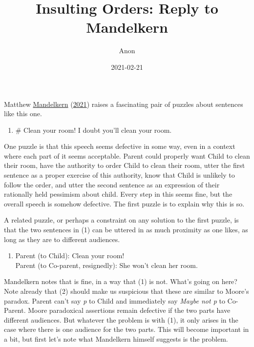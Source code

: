 \documentclass[
  12pt,
]{article}
\title{Insulting Orders: Reply to Mandelkern}
\author{Anon}
\date{2021-02-21}
\providecommand{\tightlist}{%
  \setlength{\itemsep}{0pt}\setlength{\parskip}{0pt}}
\begin{document}
\maketitle

Matthew \protect\hyperlink{ref-Mandelkern2021}{Mandelkern}
(\protect\hyperlink{ref-Mandelkern2021}{2021}) raises a fascinating pair
of puzzles about sentences like this one.

\begin{enumerate}
\def\labelenumi{(\arabic{enumi})}
\tightlist
\item
  \# Clean your room! I doubt you'll clean your room.
\end{enumerate}

One puzzle is that this speech seems defective in some way, even in a
context where each part of it seems acceptable. Parent could properly
want Child to clean their room, have the authority to order Child to
clean their room, utter the first sentence as a proper exercise of this
authority, know that Child is unlikely to follow the order, and utter
the second sentence as an expression of their rationally held pessimism
about child. Every step in this seems fine, but the overall speech is
somehow defective. The first puzzle is to explain why this is so.

A related puzzle, or perhaps a constraint on any solution to the first
puzzle, is that the two sentences in (1) can be uttered in as much
proximity as one likes, as long as they are to different audiences.

\begin{enumerate}
\def\labelenumi{(\arabic{enumi})}
\setcounter{enumi}{1}
\tightlist
\item
  Parent (to Child): Clean your room!\\
  Parent (to Co-parent, resignedly): She won't clean her room.
\end{enumerate}

Mandelkern notes that is fine, in a way that (1) is not. What's going on
here? Note already that (2) should make us suspicious that these are
similar to Moore's paradox. Parent can't say \emph{p} to Child and
immediately say \emph{Maybe not p} to Co-Parent. Moore paradoxical
assertions remain defective if the two parts have different audiences.
But whatever the problem is with (1), it only arises in the case where
there is one audience for the two parts. This will become important in a
bit, but first let's note what Mandelkern himself suggests is the
problem.
\end{document}
